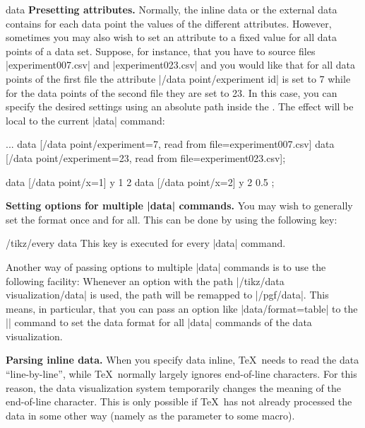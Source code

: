 \begin{datavisualizationoperation}{data}{}
    \medskip
    \textbf{Presetting attributes.}
    Normally, the inline data or the external data contains for each data point
    the values of the different attributes. However, sometimes you may also
    wish to set an attribute to a fixed value for all data points of a data
    set. Suppose, for instance, that you have to source files
    |experiment007.csv| and |experiment023.csv| and you would like that for all
    data points of the first file the attribute |/data point/experiment id| is
    set to 7 while for the data points of the second file they are set to 23.
    In this case, you can specify the desired settings using an absolute path
    inside the . The effect will be local to the current |data|
    command:
\begin{codeexample}
\datavisualization...
  data [/data point/experiment=7,  read from file=experiment007.csv]
  data [/data point/experiment=23, read from file=experiment023.csv];
\end{codeexample}

\begin{codeexample}[]
\tikz
    data [/data point/x=1] {
      y
      1
      2
    }
    data [/data point/x=2] {
      y
      2
      0.5
    };
\end{codeexample}


    \medskip
    \textbf{Setting options for multiple |data| commands.}
    You may wish to generally set the format once and for all. This can be done
    by using the following key:
    \begin{stylekey}{/tikz/every data}
        This key is executed for every |data| command.
    \end{stylekey}

    Another way of passing options to multiple |data| commands is to use the
    following facility: Whenever an option with the path
    |/tikz/data visualization/data| is used, the path will be remapped to
    |/pgf/data|. This means, in particular, that you can pass an option like
    |data/format=table| to the |\datavisualization| command to set the data
    format for all |data| commands of the data visualization.


    \medskip
    \textbf{Parsing inline data.}
    When you specify data inline, \TeX\ needs to read the data
    ``line-by-line'', while \TeX\ normally largely ignores end-of-line
    characters. For this reason, the data visualization system temporarily
    changes the meaning of the end-of-line character. This is only possible if
    \TeX\ has not already processed the data in some other way (namely as the
    parameter to some macro).


\end{datavisualizationoperation}
